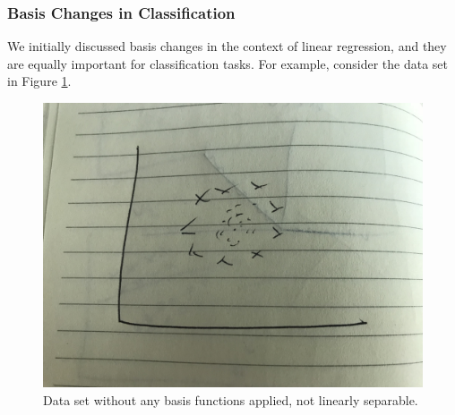 \subsubsection{Basis Changes in Classification}
We initially discussed basis changes in the context of linear regression, and they are equally important for classification tasks. For example, consider the data set in Figure \ref{fig:circles-without-basis-change}.

\begin{figure}
    \centering
    \includegraphics[width=0.5\paperwidth]{../Classification/fig/circles_without_basis_change.jpg}
    \caption{Data set without any basis functions applied, not linearly separable.}
    \label{fig:circles-without-basis-change}
\end{figure}

